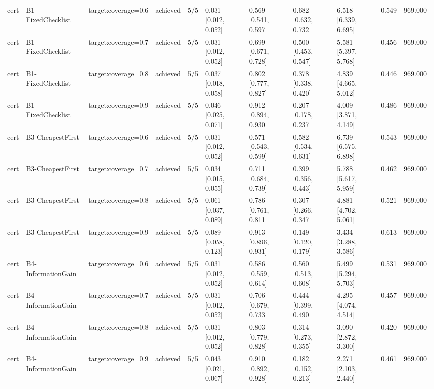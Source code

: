 \begin{table}[!ht]
{\begin{tabular}{lllllllllll}
cert & B1-FixedChecklist & target:coverage=0.6 & achieved & 5/5 & 0.031 [0.012, 0.052] & 0.569 [0.541, 0.597] & 0.682 [0.632, 0.732] & 6.518 [6.339, 6.695] & 0.549 & 969.000 \\
cert & B1-FixedChecklist & target:coverage=0.7 & achieved & 5/5 & 0.031 [0.012, 0.052] & 0.699 [0.671, 0.728] & 0.500 [0.453, 0.547] & 5.581 [5.397, 5.768] & 0.456 & 969.000 \\
cert & B1-FixedChecklist & target:coverage=0.8 & achieved & 5/5 & 0.037 [0.018, 0.058] & 0.802 [0.777, 0.827] & 0.378 [0.338, 0.420] & 4.839 [4.665, 5.012] & 0.446 & 969.000 \\
cert & B1-FixedChecklist & target:coverage=0.9 & achieved & 5/5 & 0.046 [0.025, 0.071] & 0.912 [0.894, 0.930] & 0.207 [0.178, 0.237] & 4.009 [3.871, 4.149] & 0.486 & 969.000 \\
cert & B3-CheapestFirst & target:coverage=0.6 & achieved & 5/5 & 0.031 [0.012, 0.052] & 0.571 [0.543, 0.599] & 0.582 [0.534, 0.631] & 6.739 [6.575, 6.898] & 0.543 & 969.000 \\
cert & B3-CheapestFirst & target:coverage=0.7 & achieved & 5/5 & 0.034 [0.015, 0.055] & 0.711 [0.684, 0.739] & 0.399 [0.356, 0.443] & 5.788 [5.617, 5.959] & 0.462 & 969.000 \\
cert & B3-CheapestFirst & target:coverage=0.8 & achieved & 5/5 & 0.061 [0.037, 0.089] & 0.786 [0.761, 0.811] & 0.307 [0.266, 0.347] & 4.881 [4.702, 5.061] & 0.521 & 969.000 \\
cert & B3-CheapestFirst & target:coverage=0.9 & achieved & 5/5 & 0.089 [0.058, 0.123] & 0.913 [0.896, 0.931] & 0.149 [0.120, 0.179] & 3.434 [3.288, 3.586] & 0.613 & 969.000 \\
cert & B4-InformationGain & target:coverage=0.6 & achieved & 5/5 & 0.031 [0.012, 0.052] & 0.586 [0.559, 0.614] & 0.560 [0.513, 0.608] & 5.499 [5.294, 5.703] & 0.531 & 969.000 \\
cert & B4-InformationGain & target:coverage=0.7 & achieved & 5/5 & 0.031 [0.012, 0.052] & 0.706 [0.679, 0.733] & 0.444 [0.399, 0.490] & 4.295 [4.074, 4.514] & 0.457 & 969.000 \\
cert & B4-InformationGain & target:coverage=0.8 & achieved & 5/5 & 0.031 [0.012, 0.052] & 0.803 [0.779, 0.828] & 0.314 [0.273, 0.355] & 3.090 [2.872, 3.300] & 0.420 & 969.000 \\
cert & B4-InformationGain & target:coverage=0.9 & achieved & 5/5 & 0.043 [0.021, 0.067] & 0.910 [0.892, 0.928] & 0.182 [0.152, 0.213] & 2.271 [2.103, 2.440] & 0.461 & 969.000 \\

\end{tabular}}
\end{table}

